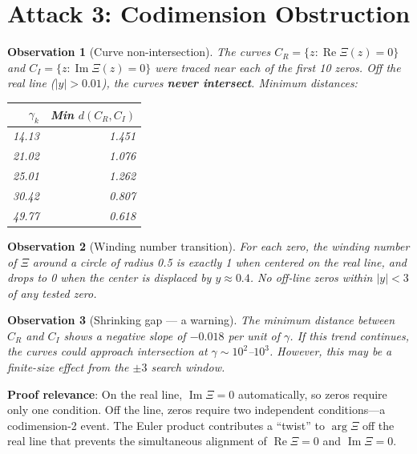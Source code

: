 \documentclass[11pt]{article}
\newtheorem{observation}{Observation}
\begin{document}
\section{Attack 3: Codimension Obstruction}

\begin{observation}[Curve non-intersection]
The curves $C_R = \{z : \operatorname{Re}\Xi(z) = 0\}$ and $C_I = \{z : \operatorname{Im}\Xi(z) = 0\}$ were traced near each of the first 10 zeros.  Off the real line ($|y| > 0.01$), the curves \textbf{never intersect}.  Minimum distances:

\begin{center}
\begin{tabular}{rr}
\toprule
$\gamma_k$ & Min $d(C_R, C_I)$ \\
\midrule
14.13 & 1.451 \\
21.02 & 1.076 \\
25.01 & 1.262 \\
30.42 & 0.807 \\
49.77 & 0.618 \\
\bottomrule
\end{tabular}
\end{center}
\end{observation}

\begin{observation}[Winding number transition]
For each zero, the winding number of $\Xi$ around a circle of radius 0.5 is exactly 1 when centered on the real line, and drops to 0 when the center is displaced by $y \approx 0.4$.  No off-line zeros within $|y| < 3$ of any tested zero.
\end{observation}

\begin{observation}[Shrinking gap --- a warning]
The minimum distance between $C_R$ and $C_I$ shows a negative slope of $-0.018$ per unit of $\gamma$.  If this trend continues, the curves could approach intersection at $\gamma \sim 10^2$--$10^3$.  However, this may be a finite-size effect from the $\pm 3$ search window.
\end{observation}

\noindent\textbf{Proof relevance}: On the real line, $\operatorname{Im}\Xi = 0$ automatically, so zeros require only one condition.  Off the line, zeros require two independent conditions---a codimension-2 event.  The Euler product contributes a ``twist'' to $\arg\Xi$ off the real line that prevents the simultaneous alignment of $\operatorname{Re}\Xi = 0$ and $\operatorname{Im}\Xi = 0$.
\end{document}
